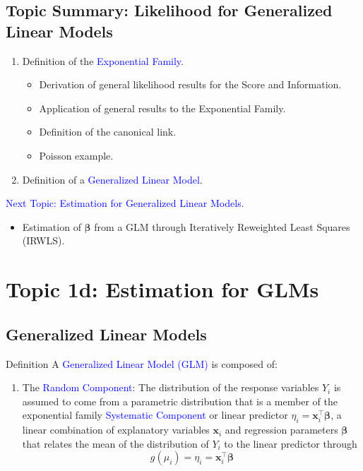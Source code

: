 \documentclass[oneside]{book}\usepackage[]{graphicx}\usepackage[svgnames]{xcolor}
\providecommand{\Vector}[1]{\bm{#1}}%
\begin{document}
\subsection*{Topic Summary: Likelihood for Generalized Linear Models}
\begin{enumerate}[1.]
      \item Definition of the \textcolor{Blue}{Exponential Family}.
            \begin{itemize}
                  \item Derivation of general likelihood results for the Score and Information.
                  \item Application of general results to the Exponential Family.
                  \item Definition of the canonical link.
                  \item Poisson example.
            \end{itemize}
      \item Definition of a \textcolor{Blue}{Generalized Linear Model}.
\end{enumerate}
\textcolor{Blue}{Next Topic: Estimation for Generalized Linear Models}.
\begin{itemize}[label={}]
      \item Estimation of $ \Vector{\beta} $ from a GLM through Iteratively Reweighted Least Squares
            (IRWLS).
\end{itemize}

\section*{Topic 1d: Estimation for GLMs}
\subsection*{Generalized Linear Models}
\begin{Regular}{Definition}
    A \textcolor{Blue}{Generalized Linear Model (GLM)} is composed of:
    \begin{enumerate}[1.]
        \item The \textcolor{Blue}{Random Component}: The distribution of the response variables $ Y_i $ is
              assumed to come from a parametric distribution that is a member of the
              exponential family \textcolor{Blue}{Systematic Component} or linear predictor $ \eta_i =\Vector{x}_i^\top\Vector{\beta} $, a linear
              combination of explanatory variables $ \Vector{x}_i $ and regression parameters $ \Vector{\beta} $
              that relates the mean of the distribution of $ Y_i $ to the linear predictor through
              \[ g(\mu_i)=\eta_i=\Vector{x}_i^\top\Vector{\beta} \]
    \end{enumerate}
\end{Regular}
\end{document}
